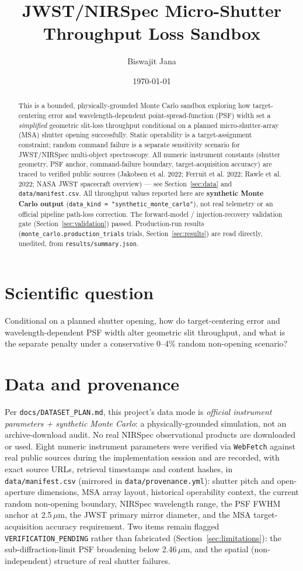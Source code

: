 \documentclass[11pt]{article}
\title{JWST/NIRSpec Micro-Shutter Throughput Loss Sandbox}
\author{Biswajit Jana}
\date{\today}
\begin{document}
\maketitle

\begin{abstract}
This is a bounded, physically-grounded Monte Carlo sandbox exploring how
target-centering error and wavelength-dependent point-spread-function (PSF)
width set a \emph{simplified} geometric slit-loss throughput conditional on
a planned micro-shutter-array (MSA) shutter opening successfully. Static
operability is a target-assignment constraint; random command failure is a
separate sensitivity scenario for JWST/NIRSpec
multi-object spectroscopy. All numeric instrument constants (shutter
geometry, PSF anchor, command-failure boundary, target-acquisition accuracy) are
traced to verified public sources (Jakobsen et al. 2022; Ferruit et al. 2022;
Rawle et al. 2022; NASA JWST spacecraft overview) --- see
Section~\ref{sec:data} and \texttt{data/manifest.csv}. All throughput values
reported here are \textbf{synthetic Monte Carlo output}
(\texttt{data\_kind = "synthetic\_monte\_carlo"}), not real telemetry or an
official pipeline path-loss correction. The forward-model / injection-recovery
validation gate (Section~\ref{sec:validation}) passed. Production-run results
(\texttt{monte\_carlo.production\_trials} trials, Section~\ref{sec:results})
are read directly, unedited, from \texttt{results/summary.json}.
\end{abstract}

\section{Scientific question}
Conditional on a planned shutter opening, how do target-centering error and
wavelength-dependent PSF width alter geometric slit throughput, and what is
the separate penalty under a conservative 0--4\% random non-opening scenario?

\section{Data and provenance}
\label{sec:data}
Per \texttt{docs/DATASET\_PLAN.md}, this project's data mode is
\emph{official instrument parameters + synthetic Monte Carlo}: a
physically-grounded simulation, not an archive-download audit. No real
NIRSpec observational products are downloaded or used. Eight numeric
instrument parameters were verified via \texttt{WebFetch} against real
public sources during the implementation session and are recorded, with
exact source URLs, retrieval timestamps and content hashes, in
\texttt{data/manifest.csv} (mirrored in \texttt{data/provenance.yml}):
shutter pitch and open-aperture dimensions, MSA array layout, historical
operability context, the current random non-opening boundary, NIRSpec wavelength range, the PSF FWHM
anchor at 2.5\,$\mu$m, the JWST primary mirror diameter, and the MSA
target-acquisition accuracy requirement. Two items remain flagged
\texttt{VERIFICATION\_PENDING} rather than fabricated (Section~\ref{sec:limitations}):
the sub-diffraction-limit PSF broadening below 2.46\,$\mu$m, and the spatial
(non-independent) structure of real shutter failures.
\end{document}

